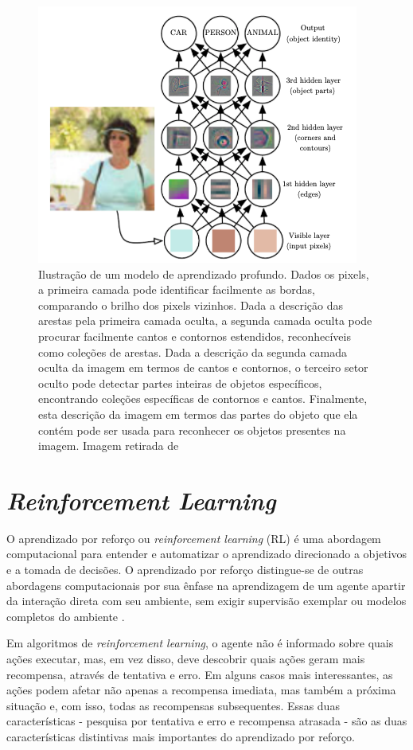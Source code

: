  \begin{figure}[h]
 \centering
 \includegraphics[width=.5 \textwidth]{conteudo/imgs/hierarquia-conceitos-dl.png}
 \caption[Ilustração de um modelo de aprendizado profundo]{Ilustração de um modelo de aprendizado profundo. Dados os pixels, a primeira camada pode identificar facilmente as bordas, comparando o brilho dos pixels vizinhos. Dada a descrição das arestas pela primeira camada oculta, a segunda camada oculta pode procurar facilmente cantos e contornos estendidos, reconhecíveis como coleções de arestas. Dada a descrição da segunda camada oculta da imagem em termos de cantos e contornos, o terceiro setor oculto pode detectar partes inteiras de objetos específicos, encontrando coleções específicas de contornos e cantos. Finalmente, esta descrição da imagem em termos das partes do objeto que ela contém pode ser usada para reconhecer os objetos presentes na imagem. Imagem retirada de \cite{Goodfellow-et-al-2016}}
 \label{hierarquia-conceitos-dl}
 \end{figure}


\section{\textit{Reinforcement Learning}} %
 \label{sec:reinforcement_learning}

 O aprendizado por reforço ou \textit{reinforcement learning} (RL) é uma abordagem computacional para entender e automatizar o aprendizado direcionado a objetivos e a tomada de decisões. O aprendizado por reforço distingue-se de outras abordagens computacionais por sua ênfase na aprendizagem de um agente apartir da interação direta com seu ambiente, sem exigir supervisão exemplar ou modelos completos do ambiente \cite{reinforcement-learning-intro-2018}.

 Em algoritmos de \textit{reinforcement learning}, o agente não é informado sobre quais ações executar, mas, em vez disso, deve descobrir quais ações geram mais recompensa, através de tentativa e erro. Em alguns casos mais interessantes, as ações podem afetar não apenas a recompensa imediata, mas também a próxima situação e, com isso, todas as recompensas subsequentes. Essas duas características - pesquisa por tentativa e erro e recompensa atrasada - são as duas características distintivas mais importantes do aprendizado por reforço.

